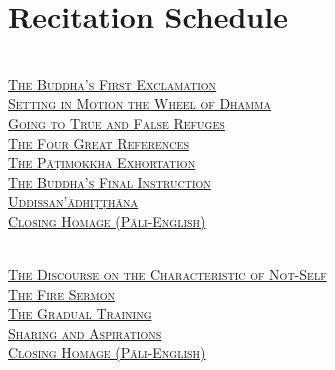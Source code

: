 \chapter{Recitation Schedule}
\label{schedule}

{\centering

  {\libertinusFont\selectfont\textbf{\textsc{\fontsize{18}{12}\selectfont{}}}}\\

  \textsc{\fontsize{14.4}{28}\selectfont
    \hyperref[buddhas-first-exclamation]{The Buddha's First Exclamation} \ifdesktopversion\else\pageref{buddhas-first-exclamation}\fi\\
    \hyperref[wheel-of-dhamma-abridged]{Setting in Motion the Wheel of Dhamma} \ifdesktopversion\else\pageref{wheel-of-dhamma-abridged}\fi\\
    \hyperref[true-false-refuges]{Going to True and False Refuges} \ifdesktopversion\else\pageref{true-false-refuges}\fi\\
    \hyperref[four-great-references]{The Four Great References} \ifdesktopversion\else\pageref{four-great-references}\fi\\
    \hyperref[patimokkha-exhortation]{The Pāṭimokkha Exhortation} \ifdesktopversion\else\pageref{patimokkha-exhortation}\fi\\
    \hyperref[buddhas-final-instruction]{The Buddha's Final Instruction} \ifdesktopversion\else\pageref{buddhas-final-instruction}\fi\\
    \hyperref[uddissanadhitthana]{Uddissan'ādhiṭṭhāna} \ifdesktopversion\else\pageref{uddissanadhitthana}\fi\\
    \hyperref[closing-homage]{Closing Homage (Pāli-English)} \ifdesktopversion\else\pageref{closing-homage}\fi\\
  }

  \vspace{1.0cm}

  {\libertinusFont\selectfont\textbf{\textsc{\fontsize{18}{12}\selectfont{}}}}\\

  \textsc{\fontsize{14.4}{28}\selectfont
    \hyperref[characteristic-of-not-self]{The Discourse on the Characteristic of Not-Self} \ifdesktopversion\else\pageref{characteristic-of-not-self}\fi\\
    \hyperref[fire-sermon]{The Fire Sermon} \ifdesktopversion\else\pageref{fire-sermon}\fi\\
    \hyperref[gradual-training]{The Gradual Training} \ifdesktopversion\else\pageref{gradual-training}\fi\\
    \hyperref[sharing-aspirations]{Sharing and Aspirations} \ifdesktopversion\else\pageref{sharing-aspirations}\fi\\
    \hyperref[closing-homage]{Closing Homage (Pāli-English)} \ifdesktopversion\else\pageref{closing-homage}\fi\\
  }

}
